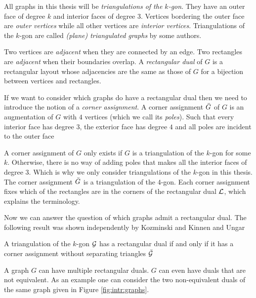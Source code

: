   All graphs in this thesis will be \emph{triangulations of the $k$-gon}. They have an outer face of degree $k$ and interior faces of degree $3$.
  Vertices bordering the outer face are \emph{outer vertices} while all other vertices are \emph{interior vertices}.
  Triangulations of the $k$-gon are called \emph{(plane) triangulated graphs} by some authors.

  Two vertices are \emph{adjacent} when they are connected by an edge. Two rectangles are \emph{adjacent} when their boundaries overlap. A \emph{rectangular dual} of $G$ is a rectangular layout whose adjacencies are the same as those of $G$ for a bijection between vertices and rectangles.

  If we want to consider which graphs do have a rectangular dual then we need to introduce the notion of a \emph{corner assignment}.
  A corner assignment $\bar{G}$ of $G$ is an augmentation of $G$ with $4$ vertices (which we call its \emph{poles}). Such that every interior face has degree $3$, the exterior face has degree $4$ and all poles are incident to the outer face

  A corner assignment of $G$ only exists if $G$ is a triangulation of the $k$-gon for some $k$. Otherwise, there is no way of adding poles that makes all the interior faces of degree $3$. Which is why we only consider triangulations of the $k$-gon in this thesis. The corner assignment $\bar{G}$ is a triangulation of the $4$-gon. Each corner assignment fixes which of the rectangles are in the corners of the rectangular dual $\mathcal{L}$, which explains the terminology.


  Now we can answer the question of which graphs admit a rectangular dual. The following result was shown independently by Kozminski and Kinnen \cite{Kozminski1984} and Ungar \cite{Ungar1953}

  \begin{thrm}
    \label{th:rect:exsitenceREctangularDual}
    A triangulation of the $k$-gon $\mathcal{G}$ has a rectangular dual if and only if it has a corner assignment without separating triangles $\bar{\mathcal{G}}$
  \end{thrm}

  A graph $G$ can have multiple rectangular duals. $G$ can even have duals that are not equivalent. As an example one can consider the two non-equivalent duals of the same graph given in Figure \ref{fig:intr:graphs}.

